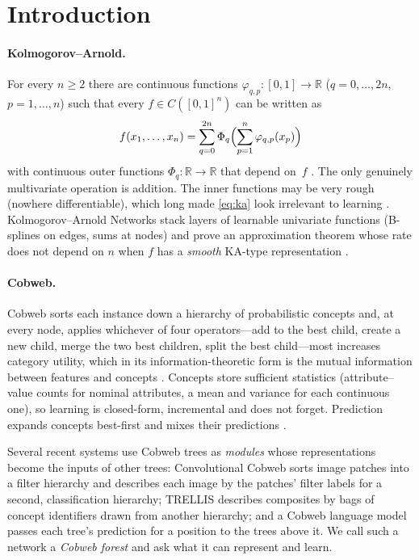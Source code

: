 \documentclass[11pt]{article}
\theoremstyle{definition}
\theoremstyle{remark}
\newcommand{\R}{\mathbb{R}}
\begin{document}
\tableofcontents

\section{Introduction}

\paragraph{Kolmogorov--Arnold.}
For every $n\ge 2$ there are continuous functions $\varphi_{q,p}:[0,1]\to\R$
($q=0,\dots,2n$, $p=1,\dots,n$) such that every $f\in C([0,1]^n)$ can be written as
\begin{equation}\label{eq:ka}
  f(x_1,\dots,x_n)=\sum_{q=0}^{2n}\Phi_q\Bigl(\sum_{p=1}^{n}\varphi_{q,p}(x_p)\Bigr)
\end{equation}
with continuous outer functions $\Phi_q:\R\to\R$ that depend on~$f$
\citep{kolmogorov1957,arnold1957,lorentz1966,sprecher1965}.  The only genuinely
multivariate operation is addition.  The inner functions may be very rough (nowhere
differentiable), which long made \eqref{eq:ka} look irrelevant to learning
\citep{girosi1989}.  Kolmogorov--Arnold Networks \citep{liu2024kan} stack layers of
learnable univariate functions (B-splines on edges, sums at nodes) and prove an
approximation theorem whose rate does not depend on $n$ when $f$ has a \emph{smooth}
KA-type representation \citep[Thm.~2.1]{liu2024kan}.

\paragraph{Cobweb.}
Cobweb \citep{fisher1987} sorts each instance down a hierarchy of probabilistic
concepts and, at every node, applies whichever of four operators---add to the best
child, create a new child, merge the two best children, split the best child---most
increases category utility, which in its information-theoretic form is the mutual
information between features and concepts \citep{corter1992,maclellan2026rational}.
Concepts store sufficient statistics (attribute--value counts for nominal attributes,
a mean and variance for each continuous one), so learning is closed-form, incremental
and does not forget.  Prediction expands concepts best-first and mixes their
predictions \citep{maclellan2026rational}.

Several recent systems use Cobweb trees as \emph{modules} whose representations become
the inputs of other trees: Convolutional Cobweb \citep{maclellan2021conv} sorts image
patches into a filter hierarchy and describes each image by the patches' filter labels
for a second, classification hierarchy; TRELLIS \citep{singaravadivelan2026trellis}
describes composites by bags of concept identifiers drawn from another hierarchy; and a
Cobweb language model passes each tree's prediction for a position to the trees above
it.  We call such a network a \emph{Cobweb forest} and ask what it can represent and
learn.
\end{document}
